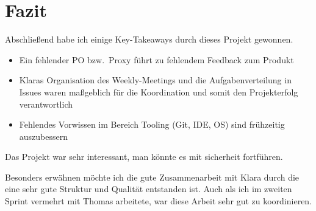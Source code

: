 

\section{Fazit}\label{sec:fazit}
Abschließend habe ich einige Key-Takeaways durch dieses Projekt gewonnen.
\begin{itemize}
    \item Ein fehlender PO bzw.\ Proxy führt zu fehlendem Feedback zum Produkt
    \item Klaras Organisation des Weekly-Meetings und die Aufgabenverteilung in Issues waren
    maßgeblich für die Koordination und
    somit den Projekterfolg verantwortlich
    \item Fehlendes Vorwissen im Bereich Tooling (Git, IDE, OS) sind frühzeitig auszubessern
\end{itemize}
Das Projekt war sehr interessant, man könnte es mit sicherheit fortführen.

Besonders erwähnen möchte ich die gute Zusammenarbeit mit Klara durch die eine sehr gute
Struktur und Qualität entstanden ist.
Auch als ich im zweiten Sprint vermehrt mit Thomas arbeitete, war diese Arbeit sehr gut zu koordinieren.